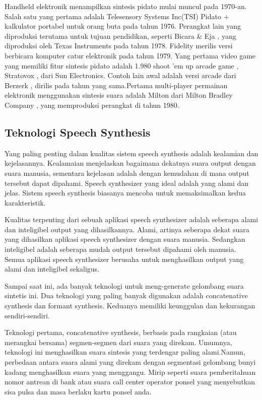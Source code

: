 Handheld elektronik menampilkan sintesis pidato mulai muncul pada 1970-an. Salah satu yang pertama adalah Telesensory Systems Inc(TSI) Pidato + kalkulator portabel untuk orang buta pada tahun 1976. Perangkat lain yang diproduksi terutama untuk tujuan pendidikan, seperti Bicara \& Eja , yang diproduksi oleh Texas Instruments pada tahun 1978. Fidelity merilis versi berbicara komputer catur elektronik pada tahun 1979. Yang pertama video game yang memiliki fitur sintesis pidato adalah 1.980 shoot ’em up arcade game , Stratovox , dari Sun Electronics. Contoh lain awal adalah versi arcade dari Berzerk , dirilis pada tahun yang sama.Pertama multi-player permainan elektronik menggunakan sintesis suara adalah Milton dari Milton Bradley Company , yang memproduksi perangkat di tahun 1980.

\subsection{Teknologi Speech Synthesis}
Yang paling penting dalam kualitas sistem speech synthesis adalah kealamian dan kejelasannya. Kealamaian menjelaskan bagaimana dekatnya suara output dengan suara manusia, sementara kejelasan adalah dengan kemudahan di mana output tersebut dapat dipahami. Speech synthesizer yang ideal adalah yang alami dan jelas. Sistem speech synthesis biasanya mencoba untuk memaksimalkan kedua karakteristik.

Kualitas terpenting dari sebuah aplikasi speech synthesizer adalah seberapa alami dan inteligibel output yang dihasilkannya. Alami, artinya seberapa dekat suara yang dihasilkan aplikasi speech synthesizer dengan suara manusia. Sedangkan inteligibel adalah seberapa mudah output tersebut dipahami oleh manusia. Semua aplikasi speech synthesizer berusaha untuk menghasilkan output yang alami dan inteligibel sekaligus.

Sampai saat ini, ada banyak teknologi untuk meng-generate gelombang suara sintetis ini. Dua teknologi yang paling banyak digunakan adalah concatenative synthesis\cite{Hunt1996UnitSI} dan formant synthesis. Keduanya memiliki keunggulan dan kekurangan sendiri-sendiri.

Teknologi pertama, concatenative synthesis\cite{Hunt1996UnitSI}, berbasis pada rangkaian (atau merangkai bersama) segmen-segmen dari suara yang direkam. Umumnya, teknologi ini menghasilkan suara sintesis yang terdengar paling alami.Namun, perbedaan antara suara alami yang direkam dengan segmentasi gelombang bunyi kadang menghasilkan suara yang menggangu. Mirip seperti suara pemberitahuan nomor antrean di bank atau suara call center operator ponsel yang menyebutkan sisa pulsa dan masa berlaku kartu ponsel anda.

